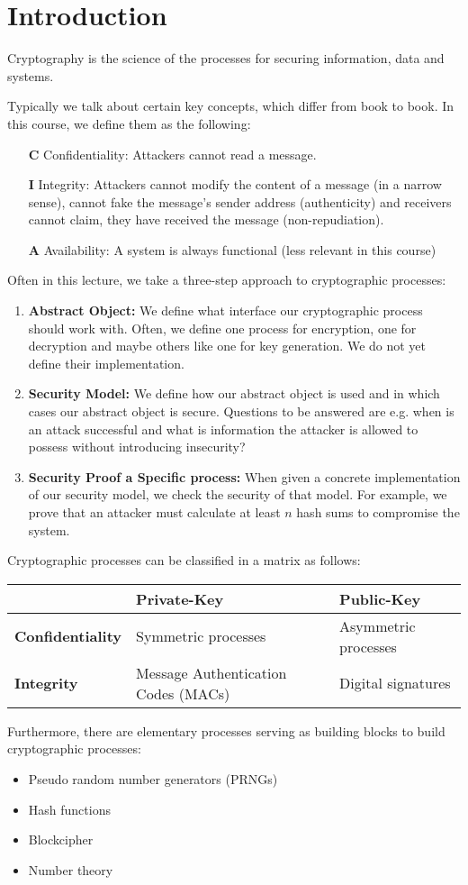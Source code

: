 \chapter{Introduction}

Cryptography is the science of the processes for securing information, data and systems.

Typically we talk about certain key concepts, which differ from book to book. In this course, we define them as the following:

\begin{enumerate}
    \item[\textbf{C}] Confidentiality: Attackers cannot read a message.
    \item[\textbf{I}] Integrity: Attackers cannot modify the content of a message (in a narrow sense), cannot fake the message's sender address (authenticity) and receivers cannot claim, they have received the message (non-repudiation).
    \item[\textbf{A}] Availability: A system is always functional (less relevant in this course)
\end{enumerate}


Often in this lecture, we take a three-step approach to cryptographic processes:

\begin{enumerate}
    \item \textbf{Abstract Object:} We define what interface our cryptographic process should work with. Often, we define one process for encryption, one for decryption and maybe others like one for key generation. We do not yet define their implementation.
    \item \textbf{Security Model:} We define how our abstract object is used and in which cases our abstract object is secure. Questions to be answered are e.g. when is an attack successful and what is information the attacker is allowed to possess without introducing insecurity?
    \item \textbf{Security Proof a Specific process:} When given a concrete implementation of our security model, we check the security of that model. For example, we prove that an attacker must calculate at least $n$ hash sums to compromise the system.
\end{enumerate}

Cryptographic processes can be classified in a matrix as follows:

\begin{tabular}{|l||l|l|}
    \hline
                             & \textbf{Private-Key}                & \textbf{Public-Key} \\
    \hline\hline
    \textbf{Confidentiality} & Symmetric processes                   & Asymmetric processes  \\
    \hline
    \textbf{Integrity}       & Message Authentication Codes (MACs) & Digital signatures  \\
    \hline
\end{tabular}

Furthermore, there are elementary processes serving as building blocks to build cryptographic processes:

\begin{itemize}
    \item Pseudo random number generators (PRNGs)
    \item Hash functions
    \item Blockcipher
    \item Number theory
\end{itemize}